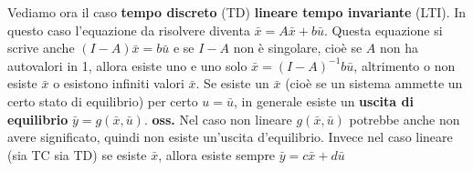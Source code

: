 Vediamo ora il caso \textbf{tempo discreto} (TD) \textbf{lineare tempo invariante} (LTI). In questo caso l'equazione da risolvere diventa $\bar{x} = A \bar{x} + b \bar{u}$. Questa equazione si scrive anche $(I-A)\bar{x} = b \bar{u}$ e se $I-A$ non è singolare, cioè se $A$ non ha autovalori in 1, allora esiste uno e uno solo $\bar{x} = (I-A)^{-1} b \bar{u}$, altrimento o non esiste $\bar{x}$ o esistono infiniti valori $\bar{x}$.\newline
\newline
Se esiste un $\bar{x}$ (cioè se un sistema ammette un certo stato di equilibrio) per certo $u = \bar{u}$, in generale esiste un \textbf{uscita di equilibrio} $\bar{y} = g(\bar{x}, \bar{u})$.\newline
\textbf{oss.} Nel caso non lineare $g(\bar{x}, \bar{u})$ potrebbe anche non avere significato, quindi non esiste un'uscita d'equilibrio. Invece nel caso lineare (sia TC sia TD) se esiste $\bar{x}$, allora esiste sempre $\bar{y} = c \bar{x} + d \bar{u}$
